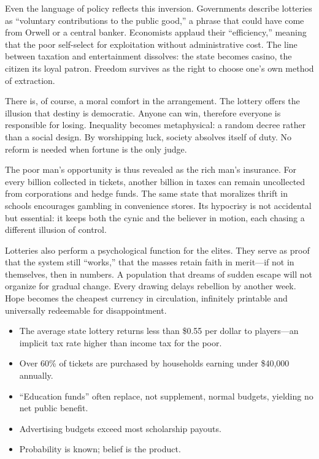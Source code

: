 \documentclass[11pt,twoside]{book}
\begin{document}
Even the language of policy reflects this inversion.  
Governments describe lotteries as “voluntary contributions to the public good,”  
a phrase that could have come from Orwell or a central banker.  
Economists applaud their “efficiency,” meaning that the poor self-select for exploitation without administrative cost.  
The line between taxation and entertainment dissolves:  
the state becomes casino, the citizen its loyal patron.  
Freedom survives as the right to choose one’s own method of extraction.

There is, of course, a moral comfort in the arrangement.  
The lottery offers the illusion that destiny is democratic.  
Anyone can win, therefore everyone is responsible for losing.  
Inequality becomes metaphysical: a random decree rather than a social design.  
By worshipping luck, society absolves itself of duty.  
No reform is needed when fortune is the only judge.

The poor man’s opportunity is thus revealed as the rich man’s insurance.  
For every billion collected in tickets, another billion in taxes can remain uncollected from corporations and hedge funds.  
The same state that moralizes thrift in schools encourages gambling in convenience stores.  
Its hypocrisy is not accidental but essential:  
it keeps both the cynic and the believer in motion, each chasing a different illusion of control.

Lotteries also perform a psychological function for the elites.  
They serve as proof that the system still “works,” that the masses retain faith in merit—if not in themselves, then in numbers.  
A population that dreams of sudden escape will not organize for gradual change.  
Every drawing delays rebellion by another week.  
Hope becomes the cheapest currency in circulation, infinitely printable and universally redeemable for disappointment.

\begin{tcolorbox}[
  title=\textbf{The Mathematics of Faith},
  colback=white,
  colframe=black,
  fonttitle=\bfseries,
  top=0.5mm,
  bottom=0.5mm,
  left=3pt,
  right=3pt,
  before skip=4pt,
  after skip=6pt,
  arc=1mm,
  boxrule=0.4pt
  ]
\setlength{\itemsep}{1pt}
\begin{itemize}
  \item The average state lottery returns less than \$0.55 per dollar to players—an implicit tax rate higher than income tax for the poor.  
  \item Over 60\% of tickets are purchased by households earning under \$40,000 annually.  
  \item “Education funds” often replace, not supplement, normal budgets, yielding no net public benefit.  
  \item Advertising budgets exceed most scholarship payouts.  
  \item Probability is known; belief is the product.  
\end{itemize}
\end{tcolorbox}
\end{document}
